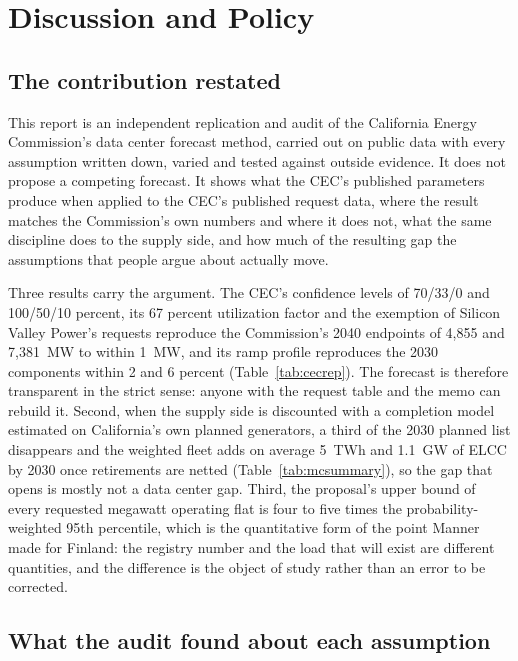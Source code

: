 \chapter{Discussion and Policy}
\label{ch:discussion}

\section{The contribution restated}
\label{sec:contribution}

This report is an independent replication and audit of the California Energy Commission's data center forecast method, carried out on public data with every assumption written down, varied and tested against outside evidence. It does not propose a competing forecast. It shows what the CEC's published parameters produce when applied to the CEC's published request data, where the result matches the Commission's own numbers and where it does not, what the same discipline does to the supply side, and how much of the resulting gap the assumptions that people argue about actually move.

Three results carry the argument. The CEC's confidence levels of 70/33/0 and 100/50/10 percent, its 67 percent utilization factor and the exemption of Silicon Valley Power's requests reproduce the Commission's 2040 endpoints of 4,855 and 7,381~MW to within 1~MW, and its ramp profile reproduces the 2030 components within 2 and 6 percent (Table~\ref{tab:cecrep}). The forecast is therefore transparent in the strict sense: anyone with the request table and the memo can rebuild it. Second, when the supply side is discounted with a completion model estimated on California's own planned generators, a third of the 2030 planned list disappears and the weighted fleet adds on average 5~TWh and 1.1~GW of ELCC by 2030 once retirements are netted (Table~\ref{tab:mcsummary}), so the gap that opens is mostly not a data center gap. Third, the proposal's upper bound of every requested megawatt operating flat is four to five times the probability-weighted 95th percentile, which is the quantitative form of the point Manner made for Finland: the registry number and the load that will exist are different quantities, and the difference is the object of study rather than an error to be corrected.

\section{What the audit found about each assumption}
\label{sec:assumptions}

